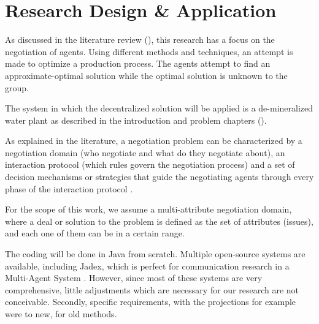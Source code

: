\chapter{Research Design \& Application}
\label{ch:design}
As discussed in the literature review (), this research has a focus on the negotiation of agents. Using different methods and techniques, an attempt is made to optimize a production process. The agents attempt to find an approximate-optimal solution while the optimal solution is unknown to the group. %

The system in which the  decentralized solution will be applied is a de-mineralized water plant as described in the introduction and problem chapters ().

As explained in the literature, a negotiation problem can be characterized by a negotiation domain (who negotiate and what do they negotiate about), an interaction protocol (which rules govern the negotiation process) and a set of decision mechanisms or strategies that guide the negotiating agents through every phase of the interaction protocol \citep{fatima2014principles}.

For the scope of this work, we assume a multi-attribute negotiation domain, where a deal or solution to the problem is defined as the set of attributes (issues), and each one of them can be in a certain range.

The coding will be done in Java from scratch. Multiple open-source systems are available, including Jadex, which is perfect for communication research in a Multi-Agent System \citep{kravari2015survey}. However, since most of these systems are very comprehensive, little adjustments which are necessary for our research are not conceivable. Secondly,  specific requirements, with the projections for example were to new, for old methods. 

